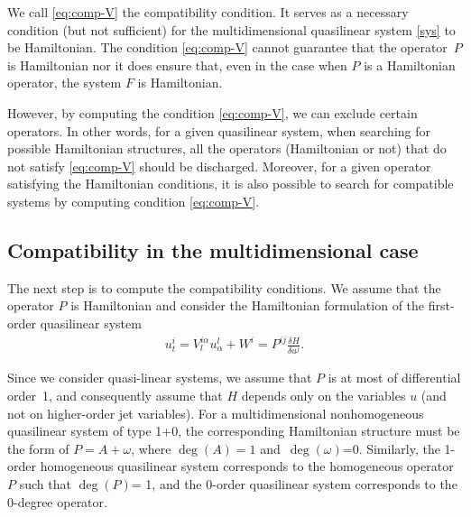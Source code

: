 \documentclass[pdftex]{sigma}
\numberwithin{equation}{section}
\begin{document}
We call \eqref{eq:comp-V} the compatibility condition. It serves as a necessary condition (but not sufficient) for the multidimensional quasilinear system \eqref{sys} to be Hamiltonian. The condition \eqref{eq:comp-V} cannot guarantee that the operator~$P$ is Hamiltonian nor it does ensure that, even in the case when $P$ is a Hamiltonian operator, the system $F$ is Hamiltonian.

However, by computing the condition \eqref{eq:comp-V}, we can exclude certain operators. In other words, for a given quasilinear system, when searching for possible Hamiltonian structures, all the operators (Hamiltonian or not) that do not satisfy \eqref{eq:comp-V} should be discharged. Moreover, for a given operator satisfying the Hamiltonian conditions, it is also possible to search for compatible systems by computing condition \eqref{eq:comp-V}.

\subsection{Compatibility in the multidimensional case}
The next step is to compute the compatibility conditions. We assume that the operator $P$ is Hamiltonian and consider the Hamiltonian formulation of the first-order quasilinear system
\begin{gather*}
u^i_t=V^{i\alpha}_lu^l_\alpha+W^i=P^{ij}\frac{\delta H}{\delta u^j}.
\end{gather*}

Since we consider quasi-linear systems, we assume that $P$ is at most of differential order~1, and consequently assume that $H$ depends only on the variables $u$ (and not on higher-order jet variables). For a multidimensional nonhomogeneous quasilinear system of type 1+0, the corresponding Hamiltonian structure must be the form of $P=A+\omega$, where $\operatorname{deg}(A)=1$ and~$\operatorname{deg}(\omega)$=0. Similarly, the 1-order homogeneous quasilinear system corresponds to the homogeneous operator $P$ such that $\operatorname{deg}(P)$= 1, and the 0-order quasilinear system corresponds to the 0-degree operator.
\end{document}
